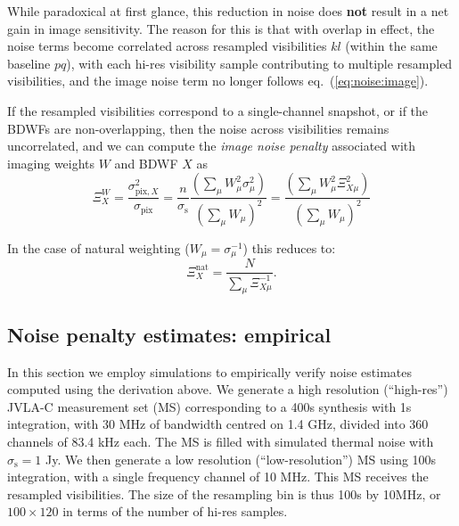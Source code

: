 \documentclass[useAMS,usenatbib]{mn2e}
\newcommand{\OMS}[1]{\textcolor{red}{{\bf OMS: #1}}}
\begin{document}
While paradoxical at first glance, this reduction in noise does {\bf not} result in a net gain in image 
sensitivity. The reason for this is that with overlap in effect, the noise terms become correlated across 
resampled visibilities $kl$ (within the same baseline $pq$), with each hi-res visibility sample contributing to 
multiple resampled visibilities, and the image noise term no longer follows eq.~(\ref{eq:noise:image}).

If the resampled visibilities correspond to a single-channel snapshot, or if the BDWFs are non-overlapping,
then the noise across visibilities remains uncorrelated, and we can compute the \emph{image noise penalty} 
associated with imaging weights $W$ and BDWF $X$ as
\begin{equation}
\Xi^W_X = 
\frac{\sigma_{\mathrm{pix},X}^2}{\sigma_{\mathrm{pix}}} = \frac{n}{\sigma_\mathrm{s}}
\frac{ (\sum_{\mu} W_{\mu}^2 \sigma_\mu^2) }{  (\sum_{\mu} W_{\mu})^2 } =
\frac{ (\sum_{\mu} W_{\mu}^2 \Xi_{X\mu}^2) }{ (\sum_{\mu} W_{\mu})^2 } 
\end{equation}

In the case of natural weighting ($W_\mu=\sigma_\mu^{-1}$) this reduces to:
\begin{equation}
\label{eq:noisepenalty:natural}
\Xi_X^{\mathrm{nat}} = \frac{N}{ \sum_{\mu} \Xi_{X\mu}^{-1} }.
\end{equation}


\subsection{Noise penalty estimates: empirical}

\label{subsec:noise}
In this section we employ simulations to empirically verify noise estimates computed using the derivation 
above. We generate a high resolution (``high-res'')
JVLA-C measurement set (MS) corresponding to a 400s synthesis with 1s integration, with 30 MHz of bandwidth
centred on 1.4 GHz, divided into 360 channels of 83.4 kHz each. The MS is filled with simulated thermal noise 
with $\sigma_\mathrm{s}=1$ Jy. We then generate a low resolution (``low-resolution'') MS using 100s integration, with 
a single frequency channel of 10 MHz. This MS receives the resampled visibilities. 
The size of the resampling bin is thus 100s by 10MHz, or $100\times120$ in terms of the number of hi-res samples.
\end{document}

